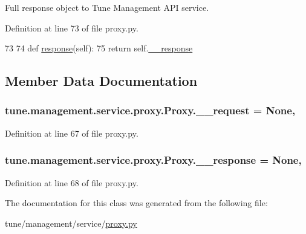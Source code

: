 Full response object to Tune Management A\-P\-I service. 



Definition at line 73 of file proxy.\-py.


\begin{DoxyCode}
73 
74     \textcolor{keyword}{def }\hyperlink{classtune_1_1management_1_1service_1_1proxy_1_1Proxy_a0b3f63ff9936b0857c4ae47b38b5f926}{response}(self):
75         \textcolor{keywordflow}{return} self.\hyperlink{classtune_1_1management_1_1service_1_1proxy_1_1Proxy_a1f7385defeef51c4ec8ca120c720dcfd}{\_\_response}

\end{DoxyCode}


\subsection{Member Data Documentation}
\hypertarget{classtune_1_1management_1_1service_1_1proxy_1_1Proxy_a8152a63a83044f4106c6202e1d3621a8}{
\subsubsection[{\-\_\-\-\_\-request}]{\setlength{\rightskip}{0pt plus 5cm}tune.\-management.\-service.\-proxy.\-Proxy.\-\_\-\-\_\-request = None\hspace{0.3cm}{\ttfamily [static]}, {\ttfamily [private]}}}\label{classtune_1_1management_1_1service_1_1proxy_1_1Proxy_a8152a63a83044f4106c6202e1d3621a8}


Definition at line 67 of file proxy.\-py.

\hypertarget{classtune_1_1management_1_1service_1_1proxy_1_1Proxy_a1f7385defeef51c4ec8ca120c720dcfd}{
\subsubsection[{\-\_\-\-\_\-response}]{\setlength{\rightskip}{0pt plus 5cm}tune.\-management.\-service.\-proxy.\-Proxy.\-\_\-\-\_\-response = None\hspace{0.3cm}{\ttfamily [static]}, {\ttfamily [private]}}}\label{classtune_1_1management_1_1service_1_1proxy_1_1Proxy_a1f7385defeef51c4ec8ca120c720dcfd}


Definition at line 68 of file proxy.\-py.



The documentation for this class was generated from the following file\-:\begin{DoxyCompactItemize}
\item 
tune/management/service/\hyperlink{proxy_8py}{proxy.\-py}\end{DoxyCompactItemize}

